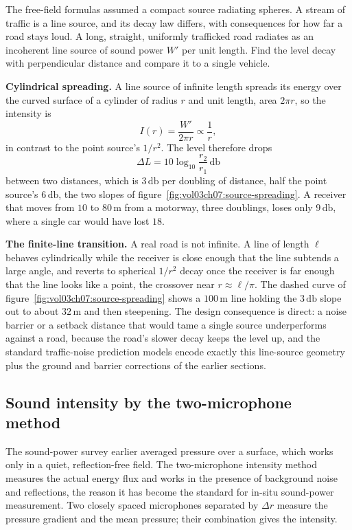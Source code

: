 The free-field formulas assumed a compact source radiating spheres. A
stream of traffic is a line source, and its decay law differs, with
consequences for how far a road stays loud. A long, straight, uniformly
trafficked road radiates as an incoherent line source of sound power
$W'$ per unit length. Find the level decay with perpendicular distance and
compare it to a single vehicle.

\textbf{Cylindrical spreading.} A line source of infinite length spreads
its energy over the curved surface of a cylinder of radius $r$ and unit
length, area $2\pi r$, so the intensity is
\[
I(r) = \frac{W'}{2\pi r}\propto \frac{1}{r},
\]
in contrast to the point source's $1/r^2$. The level therefore drops
\[
\Delta L = 10\log_{10}\frac{r_2}{r_1}\,\si{\decibel}
\]
between two distances, which is $3\,\si{\decibel}$ per doubling of distance,
half the point source's $6\,\si{\decibel}$, the two slopes of
figure~\ref{fig:vol03ch07:source-spreading}. A receiver that moves from
$10$ to $80\,\si{\meter}$ from a motorway, three doublings, loses only
$9\,\si{\decibel}$, where a single car would have lost $18$.

\textbf{The finite-line transition.} A real road is not infinite. A line of
length $\ell$ behaves cylindrically while the receiver is close enough that
the line subtends a large angle, and reverts to spherical $1/r^2$ decay
once the receiver is far enough that the line looks like a point, the
crossover near $r\approx \ell/\pi$. The dashed curve of
figure~\ref{fig:vol03ch07:source-spreading} shows a $100\,\si{\meter}$ line
holding the $3\,\si{\decibel}$ slope out to about $32\,\si{\meter}$ and then
steepening. The design consequence is direct: a noise barrier or a setback
distance that would tame a single source underperforms against a road,
because the road's slower decay keeps the level up, and the standard
traffic-noise prediction models encode exactly this line-source geometry
plus the ground and barrier corrections of the earlier sections.



\subsection{Sound intensity by the two-microphone method}

The sound-power survey earlier averaged pressure over a surface, which
works only in a quiet, reflection-free field. The two-microphone intensity
method measures the actual energy flux and works in the presence of
background noise and reflections, the reason it has become the standard for
in-situ sound-power measurement. Two closely spaced microphones separated
by $\Delta r$ measure the pressure gradient and the mean pressure; their
combination gives the intensity.

